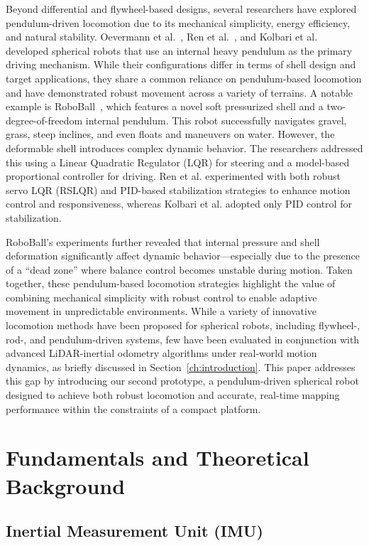 \documentclass[english, bachelor, utf8]{base/thesis_telematics}
\begin{document}
Beyond differential and flywheel-based designs, several researchers have explored pendulum-driven locomotion due to its mechanical simplicity, energy efficiency, and natural stability. 
Oevermann et al.~\cite{roboball}, Ren et al.~\cite{novelsphere}, and Kolbari et al.~\cite{pendulum_sphere} developed spherical robots that use an internal heavy pendulum as the primary driving mechanism. 
While their configurations differ in terms of shell design and target applications, they share a common reliance on pendulum-based locomotion and have demonstrated robust movement across a variety of terrains.
A notable example is RoboBall~\cite{roboball}, which features a novel soft pressurized shell and a two-degree-of-freedom internal pendulum. 
This robot successfully navigates gravel, grass, steep inclines, and even floats and maneuvers on water. 
However, the deformable shell introduces complex dynamic behavior. 
The researchers addressed this using a Linear Quadratic Regulator (LQR) for steering and a model-based proportional controller for driving. 
Ren et al. \cite{novelsphere} experimented with both robust servo LQR (RSLQR) and PID-based stabilization strategies to enhance motion control and responsiveness, whereas Kolbari et al. \cite{pendulum_sphere} adopted only PID control for stabilization. 

RoboBall’s experiments further revealed that internal pressure and shell deformation significantly affect dynamic behavior—especially due to the presence of a ``dead zone'' where balance control becomes unstable during motion.
Taken together, these pendulum-based locomotion strategies highlight the value of combining mechanical simplicity with robust control to enable adaptive movement in unpredictable environments.
While a variety of innovative locomotion methods have been proposed for spherical robots, including flywheel-, rod-, and pendulum-driven systems, few have been evaluated in conjunction with advanced LiDAR-inertial odometry algorithms under real-world motion dynamics, as briefly discussed in Section~\ref{ch:introduction}.
This paper addresses this gap by introducing our second prototype, a pendulum-driven spherical robot designed to achieve both robust locomotion and accurate, real-time mapping performance within the constraints of a compact platform.


\chapter{Fundamentals and Theoretical Background}
\section{Inertial Measurement Unit (IMU)}
\end{document}

